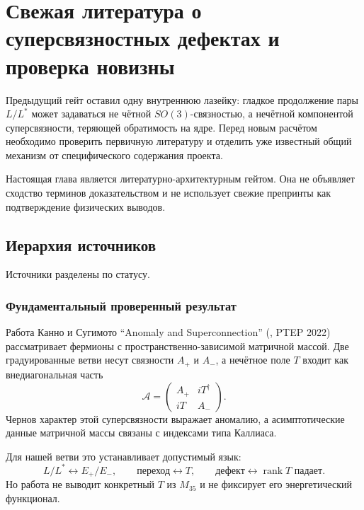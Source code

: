 \chapter{Свежая литература о суперсвязностных дефектах и проверка новизны}

Предыдущий гейт оставил одну внутреннюю лазейку: гладкое продолжение пары
$L/L^*$ может задаваться не чётной $SO(3)$-связностью, а нечётной
компонентой суперсвязности, теряющей обратимость на ядре. Перед новым
расчётом необходимо проверить первичную литературу и отделить уже известный
общий механизм от специфического содержания проекта.

Настоящая глава является литературно-архитектурным гейтом. Она не объявляет
сходство терминов доказательством и не использует свежие препринты как
подтверждение физических выводов.

\section{Иерархия источников}

Источники разделены по статусу.

\subsection{Фундаментальный проверенный результат}

Работа Канно и Сугимото ``Anomaly and Superconnection''
(, PTEP 2022) рассматривает фермионы с
пространственно-зависимой матричной массой. Две градуированные ветви несут
связности $A_+$ и $A_-$, а нечётное поле $T$ входит как внедиагональная
часть
\begin{equation}
 \mathcal A=
 \begin{pmatrix}
  A_+&iT^\dagger\\
  iT&A_-
 \end{pmatrix}.
 \label{eq:v5-literature-standard-superconnection}
\end{equation}
Чернов характер этой суперсвязности выражает аномалию, а асимптотические
данные матричной массы связаны с индексами типа Каллиаса.

Для нашей ветви это устанавливает допустимый язык:
\begin{equation}
 L/L^*\leftrightarrow E_+/E_- ,\qquad
 \text{переход}\leftrightarrow T,\qquad
 \text{дефект}\leftrightarrow\operatorname{rank}T\text{ падает}.
\end{equation}
Но работа не выводит конкретный $T$ из $M_{35}$ и не фиксирует его
энергетический функционал.

